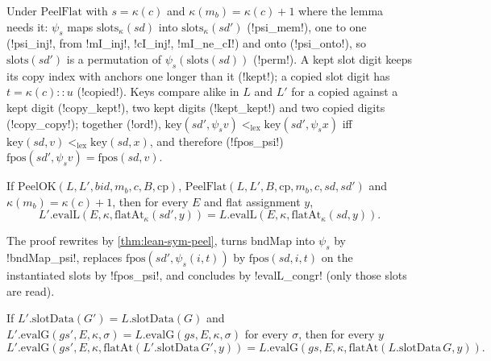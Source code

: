 \begin{theorem}
Under $\mathrm{PeelFlat}$ with $s=\kappa(c)$ and $\kappa(m_b)=\kappa(c)+1$ where the lemma needs it: $\psi_s$ maps $\mathrm{slots}_\kappa(\mathit{sd})$ into $\mathrm{slots}_\kappa(\mathit{sd}')$ (\lean!psi_mem!), one to one (\lean!psi_inj!, from \lean!mI_inj!, \lean!cI_inj!, \lean!mI_ne_cI!) and onto (\lean!psi_onto!), so $\mathrm{slots}(\mathit{sd}')$ is a permutation of $\psi_s(\mathrm{slots}(\mathit{sd}))$ (\lean!perm!). A kept slot digit keeps its copy index with anchors one longer than it (\lean!kept!); a copied slot digit has $t=\kappa(c)\mathbin{::}u$ (\lean!copied!). Keys compare alike in $L$ and $L'$ for a copied against a kept digit (\lean!copy_kept!), two kept digits (\lean!kept_kept!) and two copied digits (\lean!copy_copy!); together (\lean!ord!), $\mathrm{key}(\mathit{sd}',\psi_s v)<_{\mathrm{lex}}\mathrm{key}(\mathit{sd}',\psi_s x)$ iff $\mathrm{key}(\mathit{sd},v)<_{\mathrm{lex}}\mathrm{key}(\mathit{sd},x)$, and therefore (\lean!fpos_psi!) $\mathrm{fpos}(\mathit{sd}',\psi_s v)=\mathrm{fpos}(\mathit{sd},v)$.
\end{theorem}

\begin{theorem}\label{thm:lean-sym-peel-flat}
If $\mathrm{PeelOK}(L,L',\mathit{bid},m_b,c,B,\mathrm{cp})$, $\mathrm{PeelFlat}(L,L',B,\mathrm{cp},m_b,c,\mathit{sd},\mathit{sd}')$ and $\kappa(m_b)=\kappa(c)+1$, then for every $E$ and flat assignment $y$,
\[
L'.\mathrm{evalL}(E,\kappa,\mathrm{flatAt}_\kappa(\mathit{sd}',y))=L.\mathrm{evalL}(E,\kappa,\mathrm{flatAt}_\kappa(\mathit{sd},y)).
\]
\end{theorem}

The proof rewrites by \cref{thm:lean-sym-peel}, turns $\mathrm{bndMap}$ into $\psi_s$ by \lean!bndMap_psi!, replaces $\mathrm{fpos}(\mathit{sd}',\psi_s(i,t))$ by $\mathrm{fpos}(\mathit{sd},i,t)$ on the instantiated slots by \lean!fpos_psi!, and concludes by \lean!evalL_congr! (only those slots are read).

\begin{theorem}\label{thm:lean-sym-evalG-flat}
If $L'.\mathrm{slotData}(G')=L.\mathrm{slotData}(G)$ and $L'.\mathrm{evalG}(gs',E,\kappa,\sigma)=L.\mathrm{evalG}(gs,E,\kappa,\sigma)$ for every $\sigma$, then for every $y$
\[
L'.\mathrm{evalG}(gs',E,\kappa,\mathrm{flatAt}(L'.\mathrm{slotData}\,G',y))=L.\mathrm{evalG}(gs,E,\kappa,\mathrm{flatAt}(L.\mathrm{slotData}\,G,y)).
\]
\end{theorem}

